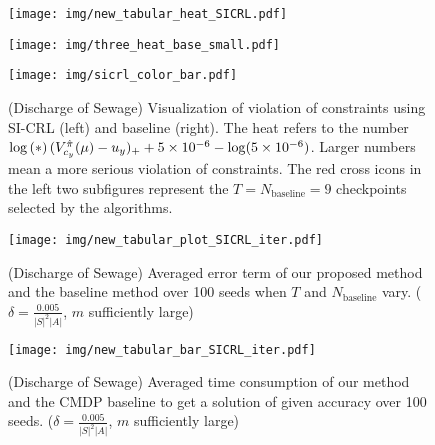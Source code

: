\begin{figure}[htbp]
\begin{minipage}[t]{0.45\linewidth}
    \centering
    \texttt{[image: img/new\_tabular\_heat\_SICRL.pdf]}
\end{minipage}
\begin{minipage}[t]{0.45\linewidth}
    \centering
    \texttt{[image: img/three\_heat\_base\_small.pdf]}
\end{minipage}
\begin{minipage}[t]{0.08\linewidth}
    \centering
    \texttt{[image: img/sicrl\_color\_bar.pdf]}
\end{minipage}
    \caption{(Discharge of Sewage) Visualization of violation of constraints using SI-CRL (left) and baseline (right). The heat refers to the number $\log\left({*}\right){(V^{\hat\pi}_{c_y}(\mu)-u_y)_++5\times10^{-6}}-\log(5\times10^{-6})$. Larger numbers mean a more serious violation of constraints. The red cross icons in the left two subfigures represent the $T=N_{\text{baseline}}=9$ checkpoints selected by the algorithms.}
    \label{Figure_Sewage_Heat}    
\end{figure}

\begin{figure}[htb]
\begin{minipage}[htb]{0.48\linewidth}
    \centering
    \texttt{[image: img/new\_tabular\_plot\_SICRL\_iter.pdf]}
    \caption{(Discharge of Sewage) Averaged error term of our proposed method and the baseline method over 100 seeds when $T$ and $N_{\text{baseline}}$ vary. ($\delta=\frac{0.005}{|S|^2|A|}$, $m$ sufficiently large)}
    \label{Figure_Sewage_Node}  
\end{minipage}
\hspace{.15in}
\begin{minipage}[htb]{0.48\linewidth}
    \centering
    \vspace{-0.1cm}
    \texttt{[image: img/new\_tabular\_bar\_SICRL\_iter.pdf]}
    \caption{(Discharge of Sewage) Averaged time consumption of our method and the CMDP baseline to get a solution of given accuracy over 100 seeds. ($\delta=\frac{0.005}{|S|^2|A|}$, $m$ sufficiently large)}
    \label{Figure_Sewage_time}  
\end{minipage}
\end{figure}



